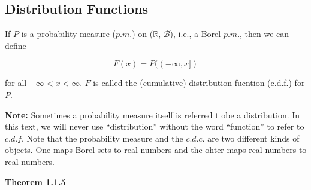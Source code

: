\documentclass[]{book}
\begin{document}
\subsection{Distribution Functions}\label{distribution-functions}

If \(P\) is a probability measure (\(p.m.\)) on (\(\mathbb{R}\),
\(\mathcal{B}\)), i.e., a Borel \(p.m.\), then we can define

\[F(x)=P((-\infty, x])\]

for all \(-\infty < x < \infty\). \(F\) is called the (cumulative)
distribution fucntion (c.d.f.) for \(P\).

\textbf{Note:} Sometimes a probability measure itself is referred t obe
a distribution. In this text, we will never use ``distribution'' without
the word ``function'' to refer to \(c.d.f.\) Note that the probability
measure and the \(c.d.c.\) are two different kinds of objects. One maps
Borel sets to real numbers and the ohter maps real numbers to real
numbers.

\textbf{Theorem 1.1.5}


\end{document}
